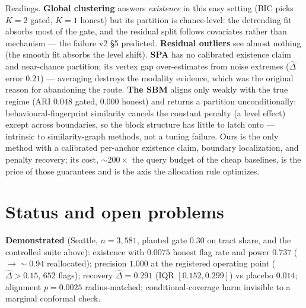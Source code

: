 \documentclass[11pt]{article}
\begin{document}
Readings. \textbf{Global clustering} answers \emph{existence} in this easy setting (BIC
picks $K{=}2$ gated, $K{=}1$ honest) but its partition is chance-level: the detrending fit
absorbs most of the gate, and the residual split follows covariates rather than mechanism ---
the failure v2 \S5 predicted. \textbf{Residual outliers} see almost nothing (the smooth fit
absorbs the level shift). \textbf{SPA} has no calibrated existence claim and near-chance
partition; its vertex gap over-estimates from noise extremes ($\widehat\Delta$ error $0.21$)
--- averaging destroys the modality evidence, which was the original reason for abandoning
the route. \textbf{The SBM} aligns only weakly with the true regime (ARI $0.048$ gated,
$0.000$ honest) and returns a partition unconditionally: behavioural-fingerprint similarity
cancels the constant penalty (a level effect) except across boundaries, so the block
structure has little to latch onto --- intrinsic to similarity-graph methods, not a tuning
failure. Ours is the only method with a calibrated per-anchor existence claim, boundary
localization, and penalty recovery; its cost, $\sim 200\times$ the query budget of the cheap
baselines, is the price of those guarantees and is the axis the allocation rule optimizes.

\section{Status and open problems}
\label{sec:open}

\textbf{Demonstrated} (Seattle, $n=3{,}581$, planted gate $0.30$ on tract share, and the
controlled suite above): existence with $0.0075$ honest flag rate and power $0.737$
($\to\sim 0.94$ reallocated); precision $1.000$ at the registered operating point
($\widehat\Delta>0.15$, $652$ flags); recovery $\widehat\Delta=0.291$
(IQR $[0.152,0.299]$) vs placebo $0.014$; alignment $p=0.0025$ radius-matched;
conditional-coverage harm invisible to a marginal conformal check.
\end{document}
